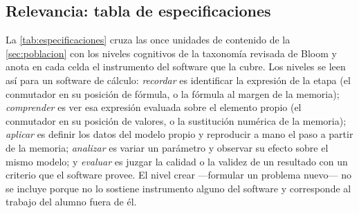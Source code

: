 \subsection{Relevancia: tabla de especificaciones}
\label{sec:relevancia-didactica}

La \autoref{tab:especificaciones} cruza las once unidades de contenido de la \autoref{sec:poblacion} con los niveles cognitivos de la taxonomía revisada de Bloom \autocite{anderson2001taxonomy} y anota en cada celda el instrumento del software que la cubre. Los niveles se leen así para un software de cálculo: \emph{recordar} es identificar la expresión de la etapa (el conmutador en su posición de fórmula, o la fórmula al margen de la memoria); \emph{comprender} es ver esa expresión evaluada sobre el elemento propio (el conmutador en su posición de valores, o la sustitución numérica de la memoria); \emph{aplicar} es definir los datos del modelo propio y reproducir a mano el paso a partir de la memoria; \emph{analizar} es variar un parámetro y observar su efecto sobre el mismo modelo; y \emph{evaluar} es juzgar la calidad o la validez de un resultado con un criterio que el software provee. El nivel crear —formular un problema nuevo— no se incluye porque no lo sostiene instrumento alguno del software y corresponde al trabajo del alumno fuera de él.

